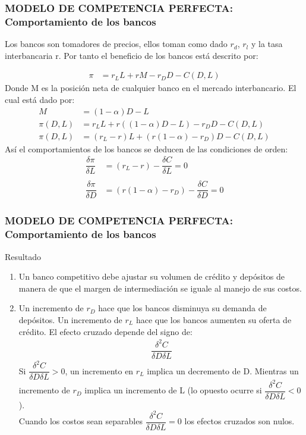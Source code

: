 \documentclass[10pt, xcolor=table, x11names]{beamer}
\begin{document}
\begin{frame}
    \frametitle{{\normalsize MODELO DE COMPETENCIA PERFECTA: Comportamiento de los bancos} {}}
    
    Los bancos son tomadores de precios, ellos toman como dado $r_{d}$, $r_{l}$ y la tasa interbancaria r. Por tanto el beneficio de los bancos está descrito por:
    
   \begin{align}
   \pi&=r_{L}L+rM-r_{D}D-C(D,L) \nonumber
   \end{align}    
    Donde M es la posición neta de cualquier banco en el mercado interbancario. El cual está dado por:
    \begin{align}
    M&=(1-\alpha)D-L \nonumber\\
    \pi(D,L)&=r_{L}L+r((1-\alpha)D-L)-r_{D}D-C(D,L) \nonumber \\
    \pi(D,L)&=(r_{L}-r)L+(r(1-\alpha)-r_{D})D-C(D,L) 
    \end{align} 
    Así el comportamientos de los bancos se deducen de las condiciones de orden:
    \begin{align}
    \dfrac{\delta \pi}{\delta L}&=(r_{L}-r)-\dfrac{\delta C}{\delta L}=0  \nonumber \\
    & \\
    \dfrac{\delta \pi}{\delta D}&=(r(1-\alpha)-r_{D})-\dfrac{\delta C}{\delta D}=0  \nonumber
    \end{align} 
    
    
    
\end{frame}




\begin{frame}
    \frametitle{{\normalsize MODELO DE COMPETENCIA PERFECTA: Comportamiento de los bancos} {}}
    \begin{block} {Resultado}
        \begin{enumerate}
            \item Un banco competitivo debe ajustar su volumen de crédito y depósitos de manera de que el margen de intermediación se iguale al manejo de sus costos.
            \item Un incremento de $r_{D}$ hace que los bancos disminuya su demanda de depósitos. Un incremento de $r_{L}$ hace que los bancos aumenten su oferta de crédito. El efecto cruzado depende del signo de:
          \begin{align}
          \dfrac{\delta^{2}C}{\delta D \delta L} \nonumber
          \end{align} 
          Si $\dfrac{\delta^{2}C}{\delta D \delta L}>0 $, un incremento en $r_{L}$ implica un decremento de D. Mientras un incremento de  $r_{D}$ implica un incremento de L (lo opuesto ocurre si $\dfrac{\delta^{2}C}{\delta D \delta L}<0 $ ).\\
           Cuando los costos sean separables $\dfrac{\delta^{2}C}{\delta D \delta L}=0 $ los efectos cruzados son nulos.   
        \end{enumerate}     
        
    \end{block}	 


\end{frame}
\end{document}
